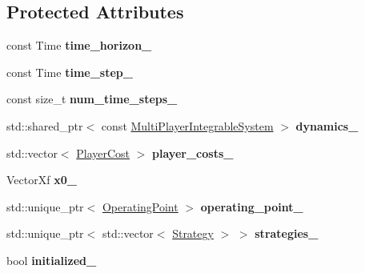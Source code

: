 \subsection*{Protected Attributes}
\begin{DoxyCompactItemize}
\item 
const Time {\bfseries time\+\_\+horizon\+\_\+}\hypertarget{classilqgames_1_1_problem_ab93ced52c3e5aa22bdf45cb94eaaaa2e}{}\label{classilqgames_1_1_problem_ab93ced52c3e5aa22bdf45cb94eaaaa2e}

\item 
const Time {\bfseries time\+\_\+step\+\_\+}\hypertarget{classilqgames_1_1_problem_af66867cb1c107633fe644d223fd6046b}{}\label{classilqgames_1_1_problem_af66867cb1c107633fe644d223fd6046b}

\item 
const size\+\_\+t {\bfseries num\+\_\+time\+\_\+steps\+\_\+}\hypertarget{classilqgames_1_1_problem_a7f8a3ec65d0c1ae8008169336a696257}{}\label{classilqgames_1_1_problem_a7f8a3ec65d0c1ae8008169336a696257}

\item 
std\+::shared\+\_\+ptr$<$ const \hyperlink{classilqgames_1_1_multi_player_integrable_system}{Multi\+Player\+Integrable\+System} $>$ {\bfseries dynamics\+\_\+}\hypertarget{classilqgames_1_1_problem_a278a73f88a14262e31a56478301b6bde}{}\label{classilqgames_1_1_problem_a278a73f88a14262e31a56478301b6bde}

\item 
std\+::vector$<$ \hyperlink{classilqgames_1_1_player_cost}{Player\+Cost} $>$ {\bfseries player\+\_\+costs\+\_\+}\hypertarget{classilqgames_1_1_problem_a890d48d09b1713e9993514d2f0671b14}{}\label{classilqgames_1_1_problem_a890d48d09b1713e9993514d2f0671b14}

\item 
Vector\+Xf {\bfseries x0\+\_\+}\hypertarget{classilqgames_1_1_problem_a41236f0dfbc5eb6b1ddd08a5cc6555b3}{}\label{classilqgames_1_1_problem_a41236f0dfbc5eb6b1ddd08a5cc6555b3}

\item 
std\+::unique\+\_\+ptr$<$ \hyperlink{structilqgames_1_1_operating_point}{Operating\+Point} $>$ {\bfseries operating\+\_\+point\+\_\+}\hypertarget{classilqgames_1_1_problem_a2bb96299dbdc82440d6b90865ee9b2c1}{}\label{classilqgames_1_1_problem_a2bb96299dbdc82440d6b90865ee9b2c1}

\item 
std\+::unique\+\_\+ptr$<$ std\+::vector$<$ \hyperlink{structilqgames_1_1_strategy}{Strategy} $>$ $>$ {\bfseries strategies\+\_\+}\hypertarget{classilqgames_1_1_problem_a305d33a1e20a8ae63c0c581d562c7a64}{}\label{classilqgames_1_1_problem_a305d33a1e20a8ae63c0c581d562c7a64}

\item 
bool {\bfseries initialized\+\_\+}\hypertarget{classilqgames_1_1_problem_a0a6a0254a1c98f23e1041c2d73fca29f}{}\label{classilqgames_1_1_problem_a0a6a0254a1c98f23e1041c2d73fca29f}

\end{DoxyCompactItemize}


